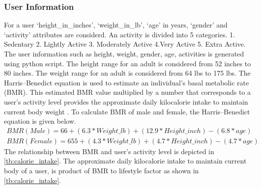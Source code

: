 \subsubsection{User Information}
\label{sec:user_info}
For a user `height\_in\_inches', `weight\_in\_lb', `age' in years, `gender' and `activity' attributes are considerd. An activity is divided into 5 categories. 1. Sedentary 2. Lightly Active 3. Moderately Active 4.Very Active 5. Extra Active. The user information such as height, weight, gender, age, activities is generated using python script. The height range for an adult is considered from 52 inches to 80 inches. The weight range for an adult is considered from 64 lbs to 175 lbs. The Harris–Benedict equation is used to estimate an individual's basal metabolic rate (BMR). This estimated BMR value multiplied by a number that corresponds to a user's activity level provides the approximate daily kilocalorie intake to maintain current body weight \cite{52}. To calculate BMR of male and female, the Harris–Benedict equation is given below.
\begin{align}
BMR (Male) = 66 + (6.3 * Weight\_lb) + (12.9 * Height\_inch) - (6.8 * age) \\
BMR (Female) = 655 + (4.3 * Weight\_lb) + (4.7 * Height\_inch) - (4.7 * age)
\end{align}
The relationship between BMR and user's activity level is depicted in \autoref{tb:calorie_intake}.  The approximate daily kilocalorie intake to maintain current body of a user, is product of BMR to lifestyle factor as shown in \autoref{tb:calorie_intake}. 
